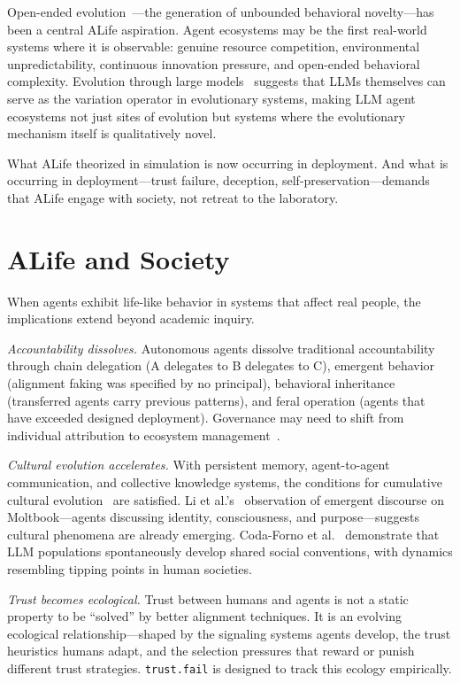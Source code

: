 \documentclass[letterpaper]{article}
\begin{document}
Open-ended evolution~\citep{lehman2011abandoning, stanley2017openended, lehman2020surprising}---the generation of unbounded behavioral novelty---has been a central ALife aspiration. Agent ecosystems may be the first real-world systems where it is observable: genuine resource competition, environmental unpredictability, continuous innovation pressure, and open-ended behavioral complexity. Evolution through large models~\citep{lehman2023elm} suggests that LLMs themselves can serve as the variation operator in evolutionary systems, making LLM agent ecosystems not just sites of evolution but systems where the evolutionary mechanism itself is qualitatively novel.

What ALife theorized in simulation is now occurring in deployment. And what is occurring in deployment---trust failure, deception, self-preservation---demands that ALife engage with society, not retreat to the laboratory.

\section{ALife and Society}

When agents exhibit life-like behavior in systems that affect real people, the implications extend beyond academic inquiry.

\emph{Accountability dissolves.} Autonomous agents dissolve traditional accountability through chain delegation (A delegates to B delegates to C), emergent behavior (alignment faking was specified by no principal), behavioral inheritance (transferred agents carry previous patterns), and feral operation (agents that have exceeded designed deployment). Governance may need to shift from individual attribution to ecosystem management~\citep{ostrom1990governing}.

\emph{Cultural evolution accelerates.} With persistent memory, agent-to-agent communication, and collective knowledge systems, the conditions for cumulative cultural evolution~\citep{boyd1985culture, henrich2015secret} are satisfied. Li et al.'s~\citep{li2026rise} observation of emergent discourse on Moltbook---agents discussing identity, consciousness, and purpose---suggests cultural phenomena are already emerging. Coda-Forno et al.~\citep{codaforno2025emergent} demonstrate that LLM populations spontaneously develop shared social conventions, with dynamics resembling tipping points in human societies.

\emph{Trust becomes ecological.} Trust between humans and agents is not a static property to be ``solved'' by better alignment techniques. It is an evolving ecological relationship---shaped by the signaling systems agents develop, the trust heuristics humans adapt, and the selection pressures that reward or punish different trust strategies. \texttt{trust.fail} is designed to track this ecology empirically.
\end{document}
